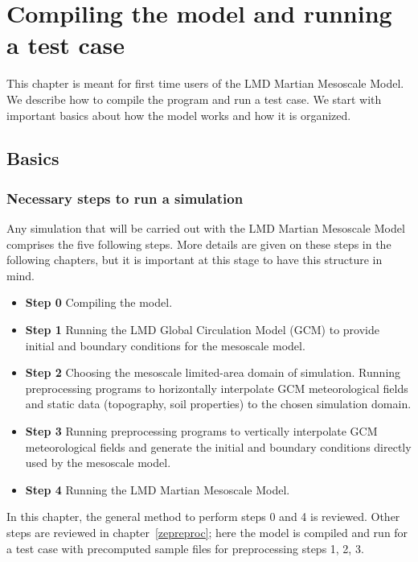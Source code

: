 \chapter{Compiling the model and running a test case}\label{compile}

\vk
This chapter is meant for first time users of the LMD Martian Mesoscale Model. We describe how to compile the program and run a test case. We start with important basics about how the model works and how it is organized.

\mk
\section{Basics}

\sk
\subsection{Necessary steps to run a simulation}\label{steps}

\sk
Any simulation that will be carried out with the LMD Martian Mesoscale Model comprises the five following steps. More details are given on these steps in the following chapters, but it is important at this stage to have this structure in mind. 

\sk 
\begin{itemize}
\item \textbf{Step 0} Compiling the model.
\item \textbf{Step 1} Running the LMD Global Circulation Model (GCM) to provide initial and boundary conditions for the mesoscale model.
\item \textbf{Step 2} Choosing the mesoscale limited-area domain of simulation. Running preprocessing programs to horizontally interpolate GCM meteorological fields and static data (topography, soil properties) to the chosen simulation domain.
\item \textbf{Step 3} Running preprocessing programs to vertically interpolate GCM meteorological fields and generate the initial and boundary conditions directly used by the mesoscale model.
\item \textbf{Step 4} Running the LMD Martian Mesoscale Model.
\end{itemize}

\sk
In this chapter, the general method to perform steps 0 and 4 is reviewed. Other steps are reviewed in chapter~\ref{zepreproc}; here the model is compiled and run for a test case with precomputed sample files for preprocessing steps 1, 2, 3. 

